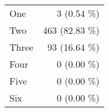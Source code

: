 \begin{tabular}{ l  r }
One & 3 (0.54 \%)\\
Two & 463 (82.83 \%)\\
Three & 93 (16.64 \%)\\
Four & 0 (0.00 \%)\\
Five & 0 (0.00 \%)\\
Six & 0 (0.00 \%)\\
\end{tabular}